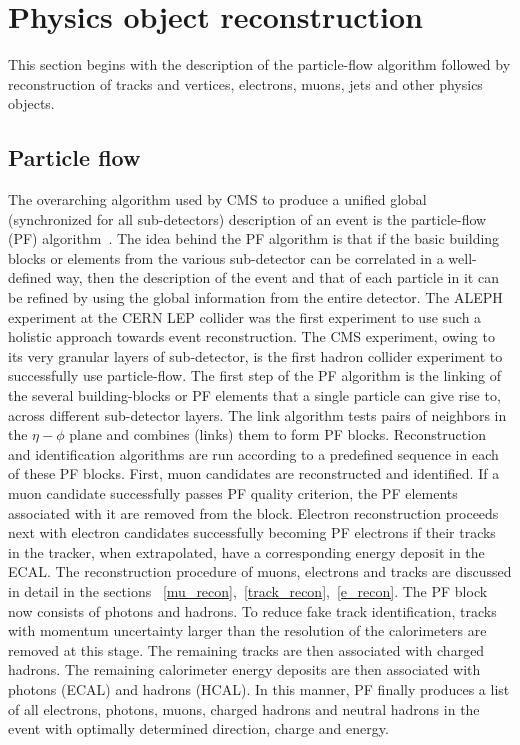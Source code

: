 \section{Physics object reconstruction}
\label{p_ob_recon}
This section begins with the description of the particle-flow algorithm followed by reconstruction of tracks and vertices, electrons, muons, jets and other physics objects.  
\subsection{Particle flow}
\label{p_flow}
The overarching algorithm used by CMS to produce a unified global (synchronized for all sub-detectors) description of an event is the particle-flow (PF) algorithm~\cite{Sirunyan:2017ulk}. The idea behind the PF algorithm is that if the basic building blocks or elements from the various sub-detector can be correlated in a well-defined way, then the description of the event and that of each particle in it can be refined by using the global information from the entire detector. The ALEPH experiment at the CERN LEP collider was the first experiment to use such a holistic approach towards event reconstruction. The CMS experiment, owing to its very  granular layers of sub-detector, is the first hadron collider experiment to successfully use particle-flow. The first step of the PF algorithm is the linking of the several building-blocks or PF elements that a single particle can give rise to, across different sub-detector layers. The link algorithm tests pairs of neighbors in the $\eta-\phi$ plane and combines (links) them to form PF blocks. Reconstruction and identification algorithms are run according to a predefined sequence in each of these PF blocks. First, muon candidates are reconstructed and identified. If a muon candidate successfully passes PF quality criterion, the PF elements associated with it are removed from the block. Electron reconstruction proceeds next with electron candidates successfully becoming PF electrons  if their tracks in the tracker, when extrapolated,  have a corresponding energy deposit in the ECAL. The reconstruction procedure of muons, electrons and tracks are discussed in detail in the sections ~\ref{mu_recon},~\ref{track_recon},~\ref{e_recon}. The PF block now consists of photons and hadrons. To reduce fake track identification, tracks with momentum uncertainty larger than the resolution of the calorimeters are removed at this stage. The remaining tracks are then associated with charged hadrons. The remaining calorimeter energy deposits are then associated with photons (ECAL) and hadrons (HCAL). In this manner, PF finally produces a list of all electrons, photons, muons, charged hadrons and neutral hadrons in the event with optimally determined direction, charge and energy.          



